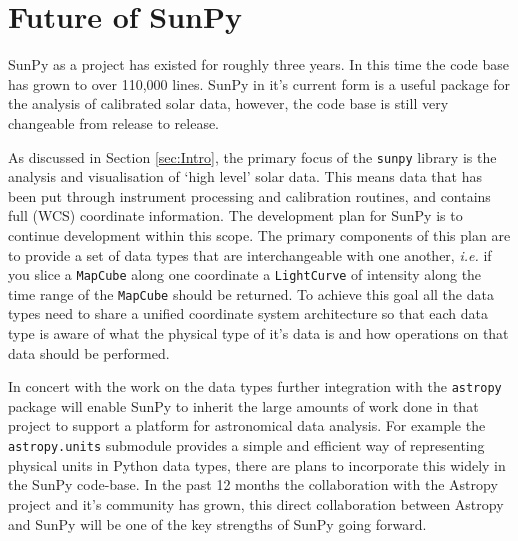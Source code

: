 \section{Future of SunPy}
SunPy as a project has existed for roughly three years. In this time 
the code 
base has grown to over 110,000 lines. SunPy in it's current form is a 
useful 
package for the analysis of calibrated solar data, however, the code 
base is 
still very changeable from release to release.

As discussed in Section \ref{sec:Intro}, the primary focus of the 
\texttt{sunpy} library is the analysis and visualisation of `high 
level' solar 
data. This means data that has been put through instrument processing 
and 
calibration routines, and contains full (WCS) coordinate information. 
The 
development plan for SunPy is to continue development within this 
scope. The 
primary components of this plan are to provide a set of data types 
that are 
interchangeable with one another, \textit{i.e.} if you slice a 
\texttt{MapCube} 
along one coordinate a \texttt{LightCurve} of intensity along the 
time range of 
the \texttt{MapCube} should be returned. To achieve this goal all the 
data 
types need to share a unified coordinate system architecture so that 
each data 
type is aware of what the physical type of it's data is and how 
operations on 
that data should be performed.

In concert with the work on the data types further integration with 
the 
\texttt{astropy} package will enable SunPy to inherit the large 
amounts of work 
done in that project to support a platform for astronomical data 
analysis. For 
example the \texttt{astropy.units} submodule provides a simple and 
efficient 
way of representing physical units in Python data types, there are 
plans to 
incorporate this widely in the SunPy code-base. In the past 12 months 
the 
collaboration with the Astropy project 
\citep{theastropycollaboration2013} and 
it's community has grown, this direct collaboration between Astropy 
and 
SunPy will be one of the key strengths of SunPy going forward.